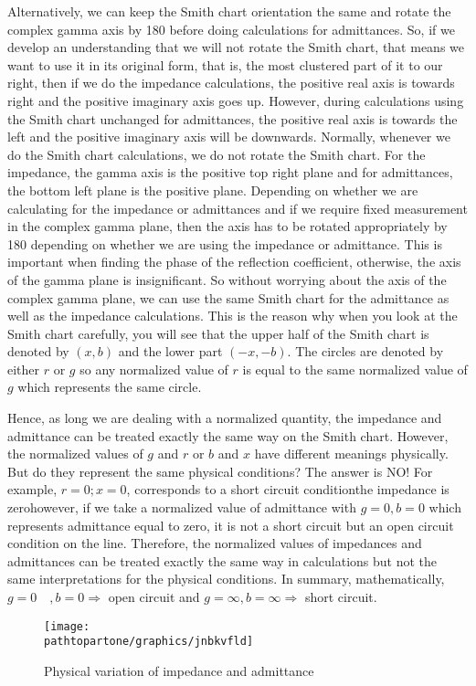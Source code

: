 Alternatively, we can keep the Smith chart orientation the same and rotate the complex gamma axis by 180\textdegree\; before doing calculations for admittances. So, if we develop an understanding that we will not rotate the Smith chart, that means we want to use it in its original form, that is, the most clustered part of it to our right, then if we do the impedance calculations, the positive real axis is towards right and the positive imaginary axis goes up. However, during calculations using the Smith chart unchanged for admittances, the positive real axis is towards the left and the positive imaginary axis will be downwards. Normally, whenever we do the Smith chart calculations, we do not rotate the Smith chart. For the impedance, the gamma axis is the positive top right plane and for admittances, the bottom left plane is the positive plane. Depending on whether we are calculating for the impedance or admittances and if we require fixed measurement in the complex gamma plane, then the axis has to be rotated appropriately by 180\textdegree\; depending on whether we are using the impedance or admittance. This is important when finding the phase of the reflection coefficient, otherwise, the axis of the gamma plane is insignificant. So without worrying about the axis of the complex gamma plane, we can use the same Smith chart for the admittance as well as the impedance calculations. This is the reason why when you look at the Smith chart carefully, you will see that the upper half of the Smith chart is denoted by $(x,b)$ and the lower part $(-x,-b)$. The circles are denoted by either $r$ or $g$ so any normalized value of $r$ is equal to the same normalized value of $g$ which represents the same circle. 

Hence, as long we are dealing with a normalized quantity, the impedance and admittance can be treated exactly the same way on the Smith chart. However, the normalized values of $g$ and $r$ or $b$ and $x$ have different meanings physically. But do they represent the same physical conditions? The answer is NO! For example, $r = 0; x = 0$, corresponds to a short circuit condition\textemdash\;the impedance is zero\textemdash\;however, if we take a normalized value of admittance with $g=0, b=0$ which represents admittance equal to zero, it is not a short circuit but an open circuit condition on the line. Therefore, the normalized values of impedances and admittances can be treated exactly the same way in calculations but not the same interpretations for the physical conditions. In summary, mathematically, $g = 0\quad, b = 0\Longrightarrow$ open circuit and $g = \infty, b = \infty \Longrightarrow$ short circuit. 
\begin{figure}[h]
\centering
\texttt{[image: \\pathtopartone/graphics/jnbkvfld]}
\caption{Physical variation of impedance and admittance}
\label{fig:jnbkvfld}
\end{figure}

